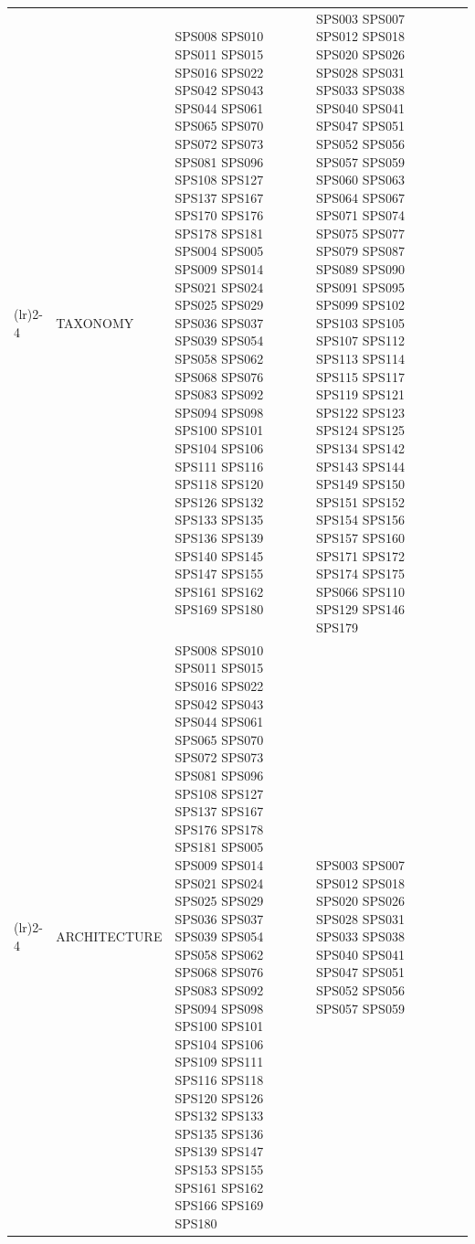 \begin{table}[htbp]
\begin{tabularx}{\textwidth}{p{0.8cm}p{2.5cm}>{\raggedright\arraybackslash}X>{\raggedright\arraybackslash}X>{\raggedright\arraybackslash}X}
		\addlinespace[0.3em]
		\cmidrule(lr){2-4}
		                                     & TAXONOMY           	   & SPS008 SPS010 SPS011 SPS015 SPS016 SPS022 
																		 SPS042 SPS043 SPS044 SPS061 SPS065 SPS070 
																		 SPS072 SPS073 SPS081 SPS096 SPS108 SPS127 
																		 SPS137 SPS167 SPS170 SPS176 SPS178 SPS181	
																		 SPS004 SPS005 SPS009 SPS014 SPS021 SPS024 
																		 SPS025 SPS029 SPS036 SPS037 SPS039 SPS054 
																		 SPS058 SPS062 SPS068 SPS076 SPS083 SPS092 
																		 SPS094 SPS098 SPS100 SPS101 SPS104 SPS106 
																		 SPS111 SPS116 SPS118 SPS120 SPS126 SPS132 
																		 SPS133 SPS135 SPS136 SPS139 SPS140 SPS145 
																		 SPS147 SPS155 SPS161 SPS162 SPS169 SPS180 	& SPS003 SPS007 SPS012 SPS018 SPS020 SPS026 
																													  SPS028 SPS031 SPS033 SPS038 SPS040 SPS041 
																													  SPS047 SPS051 SPS052 SPS056 SPS057 SPS059 
																													  SPS060 SPS063 SPS064 SPS067 SPS071 SPS074 
																													  SPS075 SPS077 SPS079 SPS087 SPS089 SPS090 
																													  SPS091 SPS095 SPS099 SPS102 SPS103 SPS105 
																													  SPS107 SPS112 SPS113 SPS114 SPS115 SPS117 
																													  SPS119 SPS121 SPS122 SPS123 SPS124 SPS125 
																													  SPS134 SPS142 SPS143 SPS144 SPS149 SPS150 
																													  SPS151 SPS152 SPS154 SPS156 SPS157 SPS160 
																													  SPS171 SPS172 SPS174 SPS175 SPS066 SPS110 
																													  SPS129 SPS146 SPS179                   											\\
		\addlinespace[0.3em]
		\cmidrule(lr){2-4}
		                                     & ARCHITECTURE            & SPS008 SPS010 SPS011 SPS015 SPS016 SPS022 
																		 SPS042 SPS043 SPS044 SPS061 SPS065 SPS070 
																		 SPS072 SPS073 SPS081 SPS096 SPS108 SPS127 
																		 SPS137 SPS167 SPS176 SPS178 SPS181 SPS005 
																		 SPS009 SPS014 SPS021 SPS024 SPS025 SPS029 
																		 SPS036 SPS037 SPS039 SPS054 SPS058 SPS062 
																		 SPS068 SPS076 SPS083 SPS092 SPS094 SPS098 
																		 SPS100 SPS101 SPS104 SPS106 SPS109 SPS111 
																		 SPS116 SPS118 SPS120 SPS126 SPS132 SPS133 
																		 SPS135 SPS136 SPS139 SPS147 SPS153 SPS155 
																		 SPS161 SPS162 SPS166 SPS169 SPS180     		& SPS003 SPS007 SPS012 SPS018 SPS020 SPS026 
																													   	  SPS028 SPS031 SPS033 SPS038 SPS040 SPS041 
																														  SPS047 SPS051 SPS052 SPS056 SPS057 SPS059 

\end{tabularx}
\end{table}
